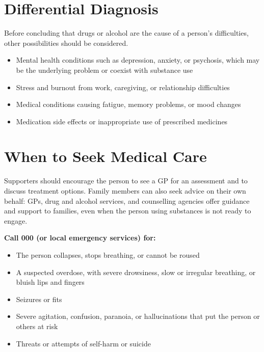 \section*{Differential Diagnosis}
Before concluding that drugs or alcohol are the cause of a person's difficulties, other possibilities should be considered.
\begin{itemize}
    \item Mental health conditions such as depression, anxiety, or psychosis, which may be the underlying problem or coexist with substance use
    \item Stress and burnout from work, caregiving, or relationship difficulties
    \item Medical conditions causing fatigue, memory problems, or mood changes
    \item Medication side effects or inappropriate use of prescribed medicines
\end{itemize}

\section*{When to Seek Medical Care}
Supporters should encourage the person to see a GP for an assessment and to discuss treatment options. Family members can also seek advice on their own behalf: GPs, drug and alcohol services, and counselling agencies offer guidance and support to families, even when the person using substances is not ready to engage.

\textbf{Call 000 (or local emergency services) for:}
\begin{itemize}
    \item The person collapses, stops breathing, or cannot be roused
    \item A suspected overdose, with severe drowsiness, slow or irregular breathing, or bluish lips and fingers
    \item Seizures or fits
    \item Severe agitation, confusion, paranoia, or hallucinations that put the person or others at risk
    \item Threats or attempts of self-harm or suicide
\end{itemize}

